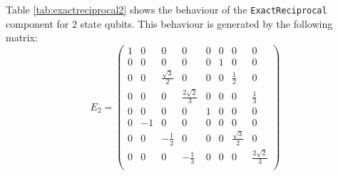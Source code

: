 \documentclass[12pt]{extarticle}
\begin{document}
Table \ref{tab:exactreciprocal2} shows the behaviour of the \texttt{ExactReciprocal} component for 2 state qubits.
This behaviour is generated by the following matrix:
\[
E_2 = \begin{pmatrix}
1 &  0 & 0                  & 0                   & 0 & 0 & 0                  & 0 \\
0 &  0 & 0                  & 0                   & 0 & 1 & 0                  & 0 \\
0 &  0 & \frac{\sqrt{3}}{2} & 0                   & 0 & 0 & \frac{1}{2}        & 0 \\
0 &  0 & 0                  & \frac{2\sqrt{2}}{3} & 0 & 0 & 0                  & \frac{1}{3} \\
0 &  0 & 0                  & 0                   & 1 & 0 & 0                  & 0 \\
0 & -1 & 0                  & 0                   & 0 & 0 & 0                  & 0 \\
0 &  0 & -\frac{1}{2}       & 0                   & 0 & 0 & \frac{\sqrt{3}}{2} & 0 \\
0 &  0 & 0                  & -\frac{1}{3}        & 0 & 0 & 0                  & \frac{2\sqrt{2}}{3} \\
\end{pmatrix}
\]
\end{document}

